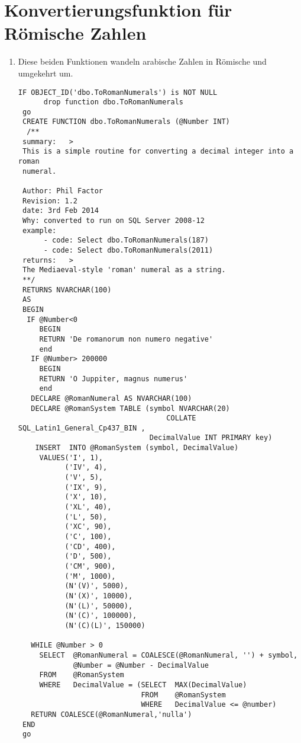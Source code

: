 \clearpage
\section{Konvertierungsfunktion für Römische Zahlen}
\begin{enumerate}
    \item Diese beiden Funktionen wandeln arabische Zahlen in Römische und umgekehrt um.
          \begin{mssql}[\FALSE]
          \end{mssql}
          \begin{lstlisting}[language=ms_sql,caption={Die Fehlermeldung in SQL Server},label=sql05_04]
  IF OBJECT_ID('dbo.ToRomanNumerals') is NOT NULL
      drop function dbo.ToRomanNumerals
 go
 CREATE FUNCTION dbo.ToRomanNumerals (@Number INT)
  /**
 summary:   >
 This is a simple routine for converting a decimal integer into a roman
 numeral.
 
 Author: Phil Factor
 Revision: 1.2
 date: 3rd Feb 2014
 Why: converted to run on SQL Server 2008-12
 example:
      - code: Select dbo.ToRomanNumerals(187)
      - code: Select dbo.ToRomanNumerals(2011)
 returns:   >
 The Mediaeval-style 'roman' numeral as a string.
 **/   
 RETURNS NVARCHAR(100)
 AS
 BEGIN
  IF @Number<0
     BEGIN
     RETURN 'De romanorum non numero negative'
     end                          
   IF @Number> 200000
     BEGIN
     RETURN 'O Juppiter, magnus numerus'
     end                          
   DECLARE @RomanNumeral AS NVARCHAR(100)
   DECLARE @RomanSystem TABLE (symbol NVARCHAR(20) 
                                   COLLATE SQL_Latin1_General_Cp437_BIN ,
                               DecimalValue INT PRIMARY key)
    INSERT  INTO @RomanSystem (symbol, DecimalValue)
     VALUES('I', 1),
           ('IV', 4),
           ('V', 5),
           ('IX', 9),
           ('X', 10),
           ('XL', 40),
           ('L', 50),
           ('XC', 90),
           ('C', 100),
           ('CD', 400),
           ('D', 500),
           ('CM', 900),
           ('M', 1000),
           (N'(V)', 5000),
           (N'(X)', 10000),
           (N'(L)', 50000),
           (N'(C)', 100000),
           (N'(C)(L)', 150000)
  
   WHILE @Number > 0
     SELECT  @RomanNumeral = COALESCE(@RomanNumeral, '') + symbol,
             @Number = @Number - DecimalValue
     FROM    @RomanSystem
     WHERE   DecimalValue = (SELECT  MAX(DecimalValue)
                             FROM    @RomanSystem
                             WHERE   DecimalValue <= @number)
   RETURN COALESCE(@RomanNumeral,'nulla')
 END
 go
  

\end{lstlisting}
\end{enumerate}
